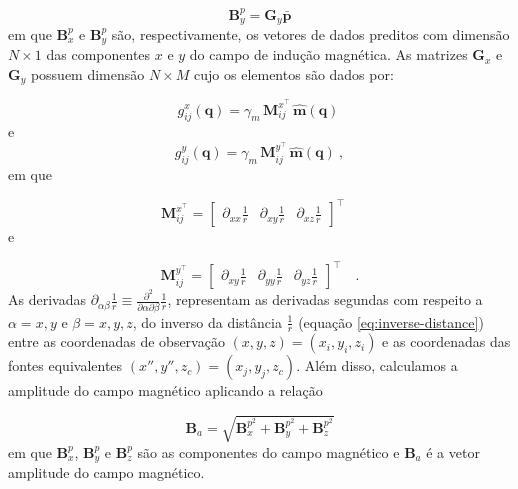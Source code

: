 \begin{equation}
\mathbf{B}_{y}^{p}  = \mathbf{G}_{y} \bar{\mathbf{p}}
\label{eq:pred_vec_y}
\end{equation}
em que $\mathbf{B}_{x}^{p}$ e $\mathbf{B}_{y}^{p}$ são, respectivamente, os vetores de dados preditos com dimensão $N \times 1$ das componentes $x$ e $y$ do campo de indução magnética. As matrizes $\mathbf{G}_{x}$ e $\mathbf{G}_{y}$ possuem dimensão $N \times M $ cujo os elementos são dados por: 

\begin{equation}
g_{ij}^{x}(\mathbf{q})  = \gamma_m \, \mathbf{M}_{ij}^{x^\top} \, \hat{\mathbf{m}}(\mathbf{q}) \: 
\label{eq:g_ij-x}
\end{equation}
e 
\begin{equation}
g_{ij}^{y}(\mathbf{q})  = \gamma_m \, \mathbf{M}_{ij}^{y^\top} \, \hat{\mathbf{m}}(\mathbf{q}) \: ,
\label{eq:g_ij-y}
\end{equation}
em que 

\begin{equation}
\mathbf{M}_{ij}^{x^\top} = \begin{bmatrix}
\partial_{xx} \frac{1}{r} & 
\partial_{xy} \frac{1}{r} &
\partial_{xz} \frac{1}{r}
\end{bmatrix}^\top \quad 
\label{eq:Mij-matrix-x}
\end{equation}
e 

\begin{equation}
\mathbf{M}_{ij}^{y^\top} = \begin{bmatrix}
\partial_{xy} \frac{1}{r} & 
\partial_{yy} \frac{1}{r} &
\partial_{yz} \frac{1}{r}
\end{bmatrix}^\top \quad .
\label{eq:Mij-matrix-y}
\end{equation}
As derivadas $\partial_{\alpha\beta} \frac{1}{r} \equiv \frac{\partial^{2}}{\partial \alpha \partial \beta} \frac{1}{r}$, representam as derivadas segundas com respeito a $\alpha = x, y$ e $\beta = x, y, z$, do inverso da distância $\frac{1}{r}$ (equação \ref{eq:inverse-distance}) entre as coordenadas de observação $(x, y, z) = (x_{i}, y_{i}, z_{i})$ e as coordenadas das fontes equivalentes $(x'', y'', z_{c}) = (x_{j}, y_{j}, z_{c})$. Além disso, calculamos a amplitude do campo magnético aplicando a relação

\begin{equation}
\mathbf{B}_a = \sqrt{ \mathbf{B}_{x}^{p^2} + \mathbf{B}_{y}^{p^2} + \mathbf{B}_{z}^{p^2}}   
\label{eq:amplitude_field}
\end{equation}
em que $\mathbf{B}_{x}^{p}$, $\mathbf{B}_{y}^{p}$ e $\mathbf{B}_{z}^{p}$ são as componentes do campo magnético e $\mathbf{B}_a$ é a vetor amplitude do campo magnético.


